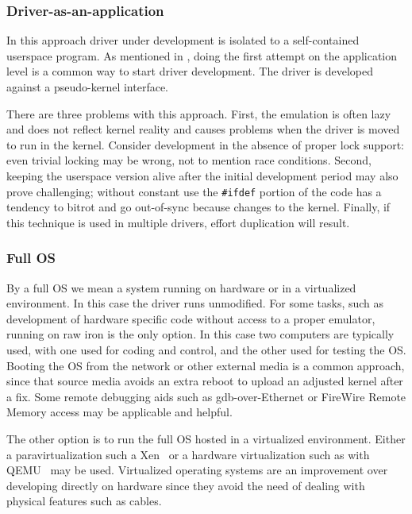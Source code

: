 \subsubsection*{Driver-as-an-application}

In this approach driver under development is isolated to a self-contained
userspace program.  As mentioned in , doing the
first attempt on the application level is a common way to start driver
development.  The driver is developed against a pseudo-kernel interface.

There are three problems with this approach.  First, the emulation
is often lazy and does not reflect kernel reality and causes
problems when the driver is moved to run in the kernel.  Consider
development in the absence of proper lock support: even trivial
locking may be wrong, not to mention race conditions.  Second,
keeping the userspace version alive after the initial development
period may also prove challenging; without constant use the
\texttt{\#ifdef} portion of the code has a tendency to bitrot and
go out-of-sync because changes to the kernel.  Finally, if this
technique is used in multiple drivers, effort duplication will
result.

\subsubsection*{Full OS}

By a full OS we mean a system running on hardware or in a virtualized
environment.  In this case the driver runs unmodified.  For some
tasks, such as development of hardware specific code without access
to a proper emulator, running on raw iron is the only option.  In
this case two computers are typically used, with one used for coding
and control, and the other used for testing the OS.  Booting the
OS from the network or other external media is a common approach,
since that source media avoids an extra reboot to upload an adjusted kernel
after a fix.  Some remote debugging aids such as gdb-over-Ethernet
or FireWire Remote Memory access may be applicable and helpful.

The other option is to run the full OS hosted in a virtualized
environment.  Either a paravirtualization such a Xen~\cite{barham:xen}
or a hardware virtualization such as with QEMU~\cite{bellard:qemu}
may be used.  Virtualized operating systems are an improvement over
developing directly on hardware since they avoid the need of dealing
with physical features such as cables.

